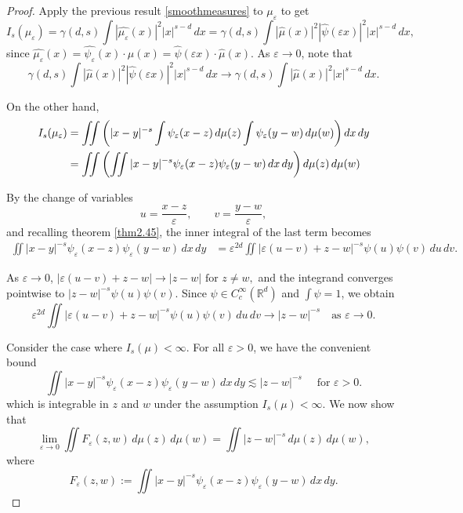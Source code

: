 \documentclass[12pt,a4paper]{report}
\theoremstyle{definition}
\begin{document}
\begin{proof}
Apply the previous result \eqref{smoothmeasures} to \( \mu_\varepsilon \) to get
\[
I_s(\mu_\varepsilon)
= \gamma(d,s) \int |\widehat{\mu_\varepsilon}(x)|^2 |x|^{s-d} \, dx
= \gamma(d,s) \int |\widehat{\mu}(x)|^2 |\widehat{\psi}(\varepsilon x)|^2 |x|^{s-d} \, dx,
\]
since \( \widehat{\mu_\varepsilon}(x) = \widehat{\psi_\varepsilon}(x) \cdot \widehat{\mu}(x) = \widehat{\psi}(\varepsilon x) \cdot \widehat{\mu}(x) \). As \( \varepsilon \to 0 \), note that
$$\gamma(d,s) \int |\widehat{\mu}(x)|^2 |\widehat{\psi}(\varepsilon x)|^2 |x|^{s-d} \, dx \to  \gamma(d,s) \int |\widehat{\mu}(x)|^2 |x|^{s-d} \, dx.$$

On the other hand,
\begin{align}
I_s(\mu_\varepsilon)
&= \iint \left( |x - y|^{-s} \int \psi_\varepsilon(x - z) \, d\mu(z) \int \psi_\varepsilon(y - w) \, d\mu(w) \right) dx \, dy \notag \\
&= \iint \left( \iint |x - y|^{-s} \psi_\varepsilon(x - z) \psi_\varepsilon(y - w) \, dx \, dy \right) d\mu(z) \, d\mu(w)
\end{align}

By the change of variables
\[
u = \frac{x - z}{\varepsilon}, \qquad v = \frac{y - w}{\varepsilon},
\]
and recalling theorem \ref{thm2.45}, the inner integral of the last term becomes
\begin{align*}
\iint |x - y|^{-s} \psi_\varepsilon(x - z) \psi_\varepsilon(y - w) \, dx \, dy
&= \varepsilon^{2d} \iint |\varepsilon(u - v) + z - w|^{-s} \psi(u) \psi(v) \, du \, dv.
\end{align*}

As \( \varepsilon \to 0 \), $|\varepsilon(u - v) + z - w| \to |z - w| \text{ for } z \ne w,$
and the integrand converges pointwise to \( |z - w|^{-s} \psi(u) \psi(v) \). Since \( \psi \in C_c^\infty(\mathbb{R}^d) \) and \( \int \psi = 1 \), we obtain
\[
\varepsilon^{2d} \iint |\varepsilon(u - v) + z - w|^{-s} \psi(u) \psi(v) \, du \, dv
\to |z - w|^{-s} \quad \text{as } \varepsilon \to 0.
\]

Consider the case where $I_s(\mu) < \infty$. For all $\varepsilon > 0$, we have the convenient bound
\[
\iint |x - y|^{-s} \psi_\varepsilon(x - z) \psi_\varepsilon(y - w) \, dx \, dy
\lesssim |z - w|^{-s} \quad \text{ for } \varepsilon > 0.
\]
which is integrable in \( z \) and \( w \) under the assumption \( I_s(\mu) < \infty \). We now show that
\[
\lim_{\varepsilon \to 0} \iint F_\varepsilon(z, w) \, d\mu(z) \, d\mu(w)
= \iint |z - w|^{-s} \, d\mu(z) \, d\mu(w),
\]
where
\[
F_\varepsilon(z, w) := \iint |x - y|^{-s} \psi_\varepsilon(x - z) \psi_\varepsilon(y - w) \, dx \, dy.
\]


\end{proof}
\end{document}

